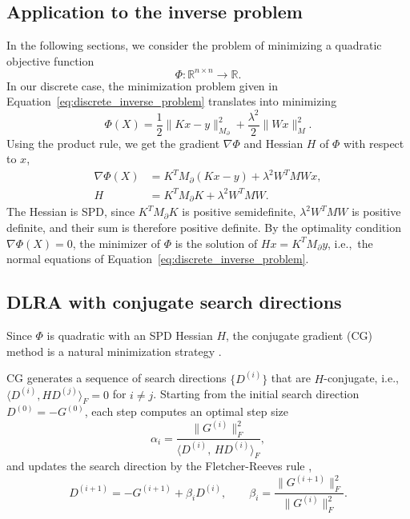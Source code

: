 \subsection{Application to the inverse problem}\label{sec:application_to_inverse_problem}
In the following sections, we consider the problem of minimizing a quadratic objective function
\begin{equation*}
    \Phi: \mathbb{R}^{n \times n} \rightarrow \mathbb R.
\end{equation*}
In our discrete case, the minimization problem given in Equation~\eqref{eq:discrete_inverse_problem} translates into minimizing
\begin{equation*}
    \Phi(X) = \frac 1 2 \|Kx - y\|_{M_\partial}^2
    + \frac{\lambda^2}{2} \| W x \|_M^2.
\end{equation*}
Using the product rule, we get the gradient $\nabla \Phi$ and Hessian $H$ of $\Phi$ with respect to $x$,
\begin{equation*}
    \begin{aligned}
    \nabla \Phi (X) &= K^T M_\partial (K x - y) + \lambda^2 W^T M W x, \\
    H &= K^T M_\partial K + \lambda^2 W^T M W.
    \end{aligned}
\end{equation*}
The Hessian is SPD, since $K^T M_\partial K$ is positive semidefinite, $\lambda^2 W^T M W$ is positive definite, and their sum is therefore positive definite. By the optimality condition $\nabla \Phi (X) = 0$, the minimizer of $\Phi$ is the solution of $H x = K^T M_\partial y$, i.e.,~the normal equations of Equation~\eqref{eq:discrete_inverse_problem}.


\subsection{DLRA with conjugate search directions}
Since $\Phi$ is quadratic with an SPD Hessian $H$, the conjugate gradient (CG) method is a natural minimization strategy \cite{saadIterativeMethodsSparse2003,fletcherFunctionMinimizationConjugate1964,hestenesMethodsConjugateGradients1952}.

CG generates a sequence of search directions $\{D^{(i)}\}$ that are $H$-conjugate, i.e., $\langle D^{(i)}, H D^{(j)}\rangle_F = 0$ for $i \neq j$. Starting from the initial search direction $D^{(0)} = -G^{(0)}$, each step computes an optimal step size
\begin{equation*}
    \alpha_i = \frac{\|G^{(i)}\|_F^2}{\langle D^{(i)},\, H D^{(i)}\rangle_F},
\end{equation*}
and updates the search direction by the Fletcher-Reeves rule \cite{fletcherFunctionMinimizationConjugate1964},
\begin{equation}\label{eq:fletcher-reeves}
    D^{(i+1)} = -G^{(i+1)} + \beta_i D^{(i)},
    \qquad
    \beta_i = \frac{\|G^{(i+1)}\|_F^2}{\|G^{(i)}\|_F^2}.
\end{equation}


